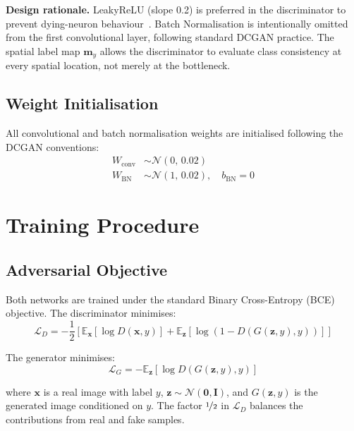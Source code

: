 \documentclass[conference]{IEEEtran}
\begin{document}
\textbf{Design rationale.} LeakyReLU (slope 0.2) is preferred in the discriminator to prevent dying-neuron behaviour~\cite{radford2016}. Batch Normalisation is intentionally omitted from the first convolutional layer, following standard DCGAN practice. The spatial label map $\mathbf{m}_y$ allows the discriminator to evaluate class consistency at every spatial location, not merely at the bottleneck.

\subsection{Weight Initialisation}
All convolutional and batch normalisation weights are initialised following the DCGAN conventions:
\begin{align}
  W_{\text{conv}}    &\sim \mathcal{N}(0,\, 0.02) \label{eq:winit_conv}\\
  W_{\text{BN}}      &\sim \mathcal{N}(1,\, 0.02),\quad b_{\text{BN}} = 0 \label{eq:winit_bn}
\end{align}

\section{Training Procedure}
\label{sec:training}

\subsection{Adversarial Objective}
Both networks are trained under the standard Binary Cross-Entropy (BCE) objective. The discriminator minimises:
\begin{equation}
  \mathcal{L}_D = -\frac{1}{2}\!\left[\mathbb{E}_{\mathbf{x}}\!\left[\log D(\mathbf{x}, y)\right]
             + \mathbb{E}_{\mathbf{z}}\!\left[\log\!\left(1 - D(G(\mathbf{z},y), y)\right)\right]\right]
  \label{eq:loss_D}
\end{equation}

The generator minimises:
\begin{equation}
  \mathcal{L}_G = -\mathbb{E}_{\mathbf{z}}\!\left[\log D(G(\mathbf{z},y),y)\right]
  \label{eq:loss_G}
\end{equation}

where $\mathbf{x}$ is a real image with label $y$, $\mathbf{z} \sim \mathcal{N}(\mathbf{0}, \mathbf{I})$, and $G(\mathbf{z}, y)$ is the generated image conditioned on $y$. The factor $\nicefrac{1}{2}$ in $\mathcal{L}_D$ balances the contributions from real and fake samples.
\end{document}
